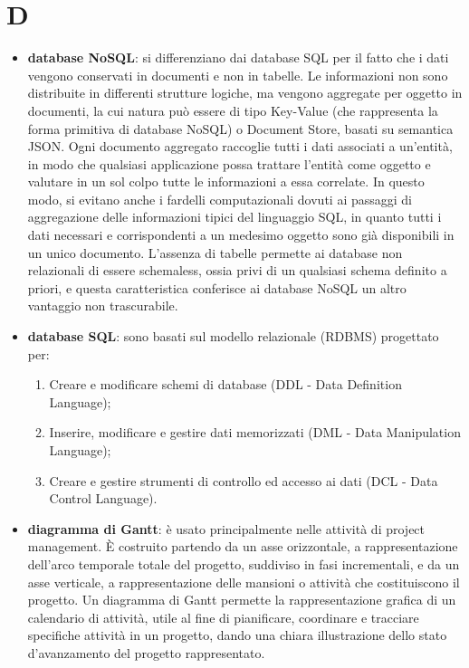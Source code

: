 \section{D}
\begin{itemize}
	\item \textbf{database NoSQL}: si differenziano dai database SQL per il fatto che i dati vengono conservati in documenti e non in tabelle. Le informazioni non sono distribuite in differenti strutture logiche, ma vengono aggregate per oggetto in documenti, la cui natura può essere di tipo Key-Value (che rappresenta la forma primitiva di database NoSQL) o Document Store, basati su semantica JSON. Ogni documento aggregato raccoglie tutti i dati associati a un’entità, in modo che qualsiasi applicazione possa trattare l’entità come oggetto e valutare in un sol colpo tutte le informazioni a essa correlate. In questo modo, si evitano anche i fardelli computazionali dovuti ai passaggi di aggregazione delle informazioni tipici del linguaggio SQL, in quanto tutti i dati necessari e corrispondenti a un medesimo oggetto sono già disponibili in un unico documento. L’assenza di tabelle permette ai database non relazionali di essere schemaless, ossia privi di un qualsiasi schema definito a priori, e questa caratteristica conferisce ai database NoSQL un altro vantaggio non trascurabile.
	\item \textbf{database SQL}: sono basati sul modello relazionale (RDBMS) progettato per:
	\begin{enumerate}  
		\item Creare e modificare schemi di database (DDL - Data Definition Language);
		\item Inserire, modificare e gestire dati memorizzati (DML - Data Manipulation Language);
		\item Creare e gestire strumenti di controllo ed accesso ai dati (DCL - Data Control Language).
	\end{enumerate}
	\item \textbf{diagramma di Gantt}: è usato principalmente nelle attività di project management. \MakeUppercase{è} costruito partendo da un asse orizzontale, a rappresentazione dell'arco temporale totale del progetto, suddiviso in fasi incrementali, e da un asse verticale, a rappresentazione delle mansioni o attività che costituiscono il progetto. Un diagramma di Gantt permette la rappresentazione grafica di un calendario di attività, utile al fine di pianificare, coordinare e tracciare specifiche attività in un progetto, dando una chiara illustrazione dello stato d'avanzamento del progetto rappresentato.

\end{itemize}
